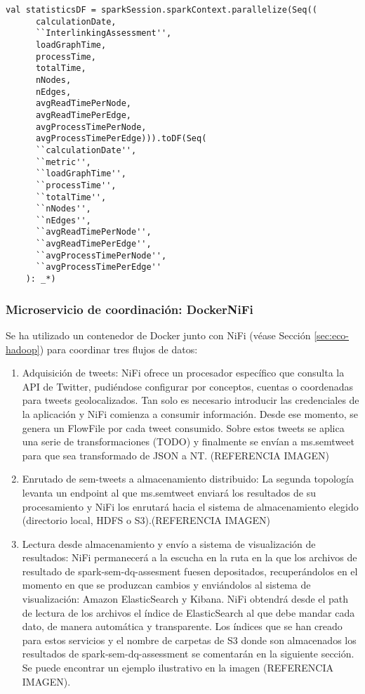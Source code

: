 \lstset{escapechar=@,language=scala}
\begin{lstlisting}[caption={Campos de salida para las métricas estadísticas
      sobre la evaluación de calidad},captionpos=b, label=statisticsJob]
    val statisticsDF = sparkSession.sparkContext.parallelize(Seq((
      calculationDate,
      ``InterlinkingAssessment'',
      loadGraphTime,
      processTime,
      totalTime,
      nNodes,
      nEdges,
      avgReadTimePerNode,
      avgReadTimePerEdge,
      avgProcessTimePerNode,
      avgProcessTimePerEdge))).toDF(Seq(
      ``calculationDate'',
      ``metric'',
      ``loadGraphTime'',
      ``processTime'',
      ``totalTime'',
      ``nNodes'',
      ``nEdges'',
      ``avgReadTimePerNode'',
      ``avgReadTimePerEdge'',
      ``avgProcessTimePerNode'',
      ``avgProcessTimePerEdge''
    ): _*)
\end{lstlisting}

\subsubsection{Microservicio de coordinación: DockerNiFi}

Se ha utilizado un contenedor de Docker junto con NiFi (véase Sección
\ref{sec:eco-hadoop}) para coordinar tres flujos de datos: 

\begin{enumerate}
\item Adquisición de tweets: NiFi ofrece un procesador específico que consulta
  la \acs{API} de Twitter, pudiéndose configurar por conceptos, cuentas o coordenadas
  para tweets geolocalizados. Tan solo es necesario introducir las credenciales
  de la aplicación y NiFi comienza a consumir información. Desde ese momento, se
  genera un FlowFile por cada tweet consumido. Sobre estos tweets se aplica una
  serie de transformaciones (TODO) y finalmente se envían a ms.semtweet para que
  sea transformado de \acs{JSON} a \acs{NT}. (REFERENCIA IMAGEN)
\item Enrutado de sem-tweets a almacenamiento distribuido: La segunda topología
  levanta un endpoint al que ms.semtweet enviará los resultados de su
  procesamiento y NiFi los enrutará hacia el sistema de almacenamiento elegido
  (directorio local, \acs{HDFS} o S3).(REFERENCIA IMAGEN) 
\item Lectura desde almacenamiento y envío a sistema de visualización de
  resultados: NiFi permanecerá a la escucha en la ruta en la que los archivos de
  resultado de spark-sem-dq-assesment fuesen depositados, recuperándolos en el
  momento en que se produzcan cambios y enviándolos al sistema de visualización:
  Amazon 
  ElasticSearch y Kibana. NiFi obtendrá desde el path de lectura de los archivos
  el índice de ElasticSearch al que debe mandar cada dato, de manera automática
  y transparente.  Los índices
  que se han creado para estos servicios y el nombre de carpetas de S3 donde son
  almacenados los resultados de spark-sem-dq-assessment se comentarán en la
  siguiente sección. Se puede encontrar un
  ejemplo ilustrativo en la imagen (REFERENCIA IMAGEN). 
\end{enumerate}

